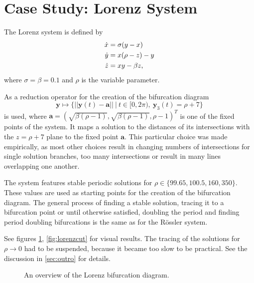 \section{Case Study: Lorenz System}

The Lorenz system is defined by
\begin{align*}
	\dot x &= \sigma (y-x)\\
	\dot y &= x(\rho-z)-y\\
	\dot z &= xy-\beta z \text,
\end{align*}
where $\sigma = \beta = 0.1$ and $\rho$ is the variable parameter.

As a reduction operator for the creation of the bifurcation diagram
\[
	\mathbf y \mapsto \{||\mathbf y(t) - \mathbf a||\ |\ t \in [0,2\pi),\ \mathbf y_3(t) = \rho + 7\}
\]
is used, where $\mathbf a = (\sqrt{\beta(\rho-1)}, \sqrt{\beta(\rho-1)}, \rho-1)^T$ is one of the fixed points of the system.
It maps a solution to the distances of its intersections with the $z = \rho+7$ plane to the fixed point $\mathbf a$.
This particular choice was made empirically, as most other choices result in changing numbers of intersections for single solution branches, too many intersections or result in many lines overlapping one another.

The system features stable periodic solutions for $\rho \in \{99.65, 100.5, 160, 350\}$.
These values are used as starting points for the creation of the bifurcation diagram.
The general process of finding a stable solution, tracing it to a bifurcation point or until otherwise satisfied, doubling the period and finding period doubling bifurcations is the same as for the Rössler system.

See figures \ref{fig:lorenzfull}, \ref{fig:lorenzcut} for visual results.
The tracing of the solutions for $\rho \to 0$ had to be suspended, because it became too slow to be practical.
See the discussion in \autoref{sec:outro} for details.


\begin{figure}
\centering{}
\caption{
	An overview of the Lorenz bifurcation diagram.
}
\label{fig:lorenzfull}
\end{figure}


